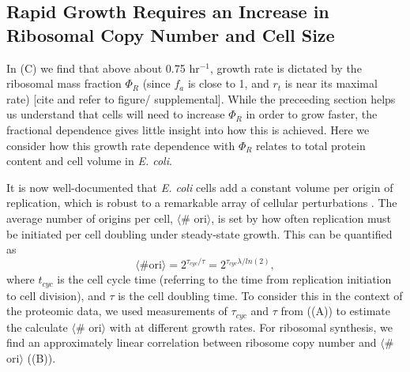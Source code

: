 \subsection{Rapid Growth Requires an Increase in Ribosomal Copy Number and Cell Size}


In (C) we find that above about  0.75 hr$^{-1}$, growth rate
is dictated by the ribosomal mass fraction $\Phi_R$ (since $f_a$ is close to 1,
and $r_t$ is near its maximal rate) [cite and refer to figure/ supplemental].
While the preceeding section helps us understand that cells will need to
increase $\Phi_R$ in order to grow faster, the fractional dependence gives
little insight into how this is achieved. Here we consider how this growth rate
dependence with $\Phi_R$ relates to total protein content and cell volume in
\textit{E. coli}.

It is now well-documented that \textit{E. coli} cells add a constant volume per
origin of replication, which is robust to a remarkable array of cellular
perturbations \citep{si2017}.  The average number of origins per cell, $\langle$\#
ori$\rangle$, is set by how often replication must be initiated per cell doubling
under steady-state growth. This can be quantified as
\begin{equation}
    \langle \text{\# ori} \rangle = 2^{\tau_{cyc} / \tau} = 2^{\tau_{cyc} \lambda / ln(2)},
    \label{eq:Nori}
\end{equation}
where $t_{cyc}$ is the cell cycle time (referring to the time from replication
initiation to cell division), and $\tau$ is the cell doubling time. To consider
this  in the context of the proteomic data, we used measurements of $\tau_{cyc}$
and  $\tau$ from \cite{si2017} ((A)) to estimate
the calculate $\langle$\# ori$\rangle$  with  at different growth
rates. For ribosomal synthesis, we find an approximately linear correlation
between ribosome copy number and $\langle$\# ori$\rangle$
((B)).

